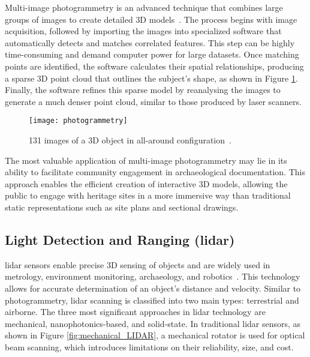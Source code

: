 Multi-image photogrammetry is an advanced technique that combines large groups of images to create detailed \gls{3D} models~\cite{mccarthy2014multi}. The process begins with image acquisition, followed by importing 
the images into specialized software that automatically detects and matches correlated features. This step can be highly time-consuming and demand computer power for large datasets. 
Once matching points are identified, the software calculates their spatial relationships, producing a sparse \gls{3D} point cloud that outlines the subject’s shape, as shown in Figure \ref{fig:photo2}. 
Finally, the software refines this sparse model by reanalysing the images to generate a much denser point cloud, similar to those produced by laser scanners.


\begin{figure}[h!]
    \centering
    \texttt{[image: photogrammetry]}
    \caption{131 images of a \gls{3D} object in all-around configuration~\cite{luhmann2016sensor}.}
    \label{fig:photo2}
\end{figure} 
\FloatBarrier

  
The most valuable application of multi-image photogrammetry
may lie in its ability to facilitate community engagement in archaeological documentation.
This approach enables the efficient creation of interactive \gls{3D} models, allowing the public to engage with heritage sites
in a more immersive way than traditional static representations such as site plans and sectional drawings. 

\subsection{Light Detection and Ranging (\gls{lidar})}
\label{sec:lidar}

\gls{lidar} sensors enable precise \gls{3D} sensing of objects and are widely used in metrology, environment monitoring, archaeology, and robotics~\cite{li2022progress}.
This technology allows for accurate determination of an object’s distance and velocity. 
Similar to photogrammetry, \gls{lidar} scanning is classified into two main types: terrestrial and airborne.
The three most significant approaches in \gls{lidar} technology are mechanical, nanophotonics-based, and solid-state.
In traditional \gls{lidar} sensors, as shown in Figure \ref{fig:mechanical_LIDAR}, a mechanical rotator is used for optical beam scanning, which introduces limitations on their reliability, size, and cost.

